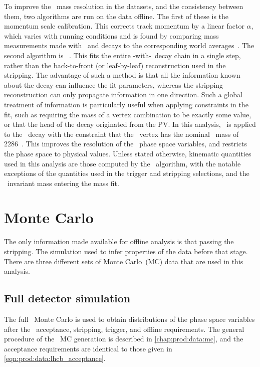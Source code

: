 To improve the \PLambdac\ mass resolution in the datasets, and the consistency 
between them, two algorithms are run on the data offline.
The first of these is the momentum scale calibration.
This corrects track momentum by a linear factor $\alpha$, which varies with 
running conditions and is found by comparing mass measurements made with 
\JpsiTomumu\ and \decay{\PBplus}{\PJpsi\PKplus} decays to the corresponding 
world averages~\cite{Aaij:2014jba}.
The second algorithm is \decaytreefitter~\cite{Hulsbergen:2005pu}.
This fits the entire \LbToLcmuX-with-\LcTophh\ decay chain in a single step, 
rather than the back-to-front (or leaf-by-leaf) reconstruction used in the 
stripping.
The advantage of such a method is that all the information known about the 
decay can influence the fit parameters, whereas the stripping reconstruction 
can only propagate information in one direction.
Such a global treatment of information is particularly useful when applying 
constraints in the fit, such as requiring the mass of a vertex combination to 
be exactly some value, or that the head of the decay originated from the 
\ac{PV}.
In this analysis, \decaytreefitter\ is applied to the \PLambdab\ decay with the 
constraint that the \phh\ vertex has the nominal \PLambdac\ mass of 
\SI{2286}{\MeVcc}~\cite{PDG2014}.
This improves the resolution of the \PLambdac\ phase space variables, and 
restricts the phase space to physical values.
Unless stated otherwise, kinematic quantities used in this analysis are those 
computed by the \decaytreefitter\ algorithm, with the notable exceptions of the 
quantities used in the trigger and stripping selections, and the \phh\ 
invariant mass entering the mass fit.

\section{Monte Carlo}
\label{chap:cpv:data:mc}

The only information made available for offline analysis is that passing the 
stripping.
The simulation used to infer properties of the data before that stage.
There are three different sets of Monte Carlo~(MC) data that are used in this 
analysis.

\subsection{Full detector simulation}
\label{chap:cpv:data:mc:full}

The full \lhcb\ Monte Carlo is used to obtain distributions of the phase space 
variables after the \lhcb\ acceptance, stripping, trigger, and offline 
requirements.
The general procedure of the \lhcb\ \ac{MC} generation is described in 
\cref{chap:prod:data:mc}, and the acceptance requirements are identical to 
those given in \cref{eqn:prod:data:lhcb_acceptance}.

